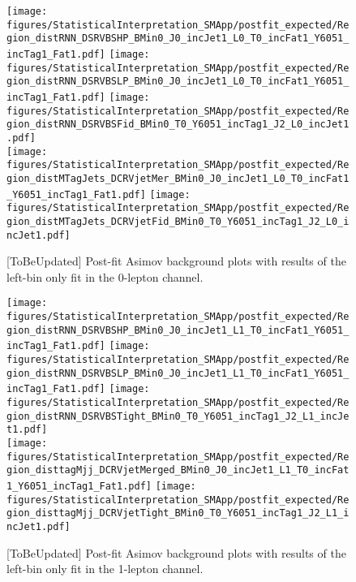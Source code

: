 \begin{figure}[h]
  \centering
  \texttt{[image: figures/StatisticalInterpretation\_SMApp/postfit\_expected/Region\_distRNN\_DSRVBSHP\_BMin0\_J0\_incJet1\_L0\_T0\_incFat1\_Y6051\_incTag1\_Fat1.pdf]}
  \texttt{[image: figures/StatisticalInterpretation\_SMApp/postfit\_expected/Region\_distRNN\_DSRVBSLP\_BMin0\_J0\_incJet1\_L0\_T0\_incFat1\_Y6051\_incTag1\_Fat1.pdf]}
  \texttt{[image: figures/StatisticalInterpretation\_SMApp/postfit\_expected/Region\_distRNN\_DSRVBSFid\_BMin0\_T0\_Y6051\_incTag1\_J2\_L0\_incJet1.pdf]}
  \\
  \texttt{[image: figures/StatisticalInterpretation\_SMApp/postfit\_expected/Region\_distMTagJets\_DCRVjetMer\_BMin0\_J0\_incJet1\_L0\_T0\_incFat1\_Y6051\_incTag1\_Fat1.pdf]}
  \texttt{[image: figures/StatisticalInterpretation\_SMApp/postfit\_expected/Region\_distMTagJets\_DCRVjetFid\_BMin0\_T0\_Y6051\_incTag1\_J2\_L0\_incJet1.pdf]}
  \caption{[ToBeUpdated] Post-fit Asimov background plots with results of the left-bin only fit in the 0-lepton channel.
  }
  \label{fig:expectedpostfit0lep}
\end{figure}
\begin{figure}[h]
  \centering
  \texttt{[image: figures/StatisticalInterpretation\_SMApp/postfit\_expected/Region\_distRNN\_DSRVBSHP\_BMin0\_J0\_incJet1\_L1\_T0\_incFat1\_Y6051\_incTag1\_Fat1.pdf]}
  \texttt{[image: figures/StatisticalInterpretation\_SMApp/postfit\_expected/Region\_distRNN\_DSRVBSLP\_BMin0\_J0\_incJet1\_L1\_T0\_incFat1\_Y6051\_incTag1\_Fat1.pdf]}
  \texttt{[image: figures/StatisticalInterpretation\_SMApp/postfit\_expected/Region\_distRNN\_DSRVBSTight\_BMin0\_T0\_Y6051\_incTag1\_J2\_L1\_incJet1.pdf]}
  \\
  \texttt{[image: figures/StatisticalInterpretation\_SMApp/postfit\_expected/Region\_disttagMjj\_DCRVjetMerged\_BMin0\_J0\_incJet1\_L1\_T0\_incFat1\_Y6051\_incTag1\_Fat1.pdf]}
  \texttt{[image: figures/StatisticalInterpretation\_SMApp/postfit\_expected/Region\_disttagMjj\_DCRVjetTight\_BMin0\_T0\_Y6051\_incTag1\_J2\_L1\_incJet1.pdf]}
  \caption{[ToBeUpdated] Post-fit Asimov background plots with results of the left-bin only fit in the 1-lepton channel.
  }
  \label{fig:expectedpostfit1lep}
\end{figure}
